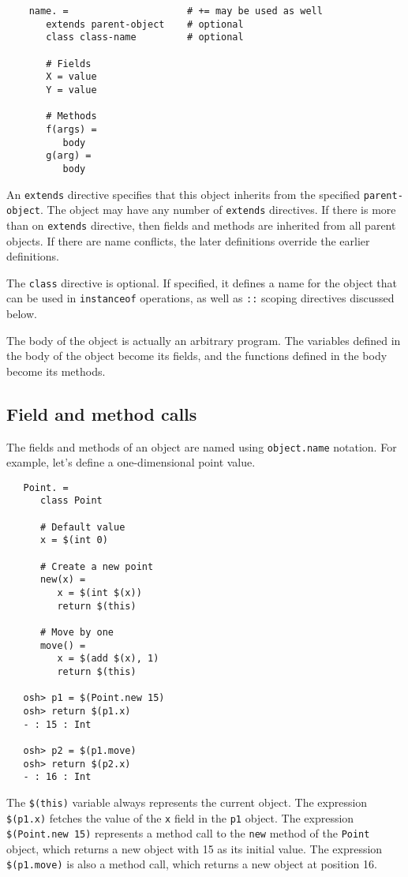 \begin{verbatim}
    name. =                     # += may be used as well
       extends parent-object    # optional
       class class-name         # optional

       # Fields
       X = value
       Y = value

       # Methods
       f(args) =
          body
       g(arg) =
          body
\end{verbatim}

An \verb+extends+ directive specifies that this object inherits from
the specified \verb+parent-object+.  The object may have any number of
\verb+extends+ directives.  If there is more than on \verb+extends+
directive, then fields and methods are inherited from all parent
objects.  If there are name conflicts, the later definitions override
the earlier definitions.

The \verb+class+ directive is optional.  If specified, it defines a name
for the object that can be used in \verb+instanceof+ operations, as well
as \verb+::+ scoping directives discussed below.

The body of the object is actually an arbitrary program.  The
variables defined in the body of the object become its fields, and the
functions defined in the body become its methods.

\subsection{Field and method calls}

The fields and methods of an object are named using \verb+object.name+ notation.
For example, let's define a one-dimensional point value.

\begin{verbatim}
   Point. =
      class Point

      # Default value
      x = $(int 0)

      # Create a new point
      new(x) =
         x = $(int $(x))
         return $(this)

      # Move by one
      move() =
         x = $(add $(x), 1)
         return $(this)

   osh> p1 = $(Point.new 15)
   osh> return $(p1.x)
   - : 15 : Int

   osh> p2 = $(p1.move)
   osh> return $(p2.x)
   - : 16 : Int
\end{verbatim}

The \verb+$(this)+ variable always represents the current object.
The expression \verb+$(p1.x)+ fetches the value of the \verb+x+ field
in the \verb+p1+ object.  The expression \verb+$(Point.new 15)+
represents a method call to the \verb+new+ method of the \verb+Point+
object, which returns a new object with 15 as its initial value.  The
expression \verb+$(p1.move)+ is also a method call, which returns a
new object at position 16.


